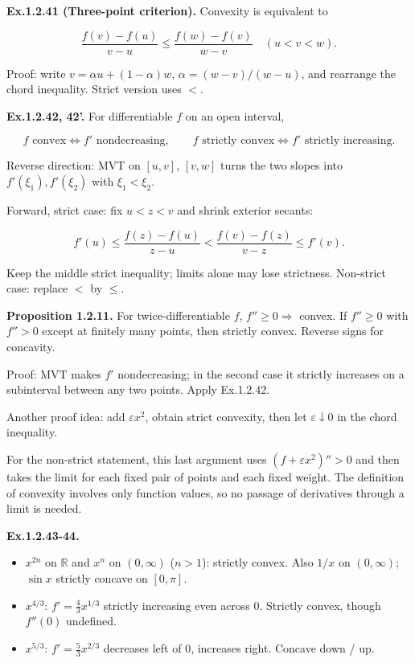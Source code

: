 \documentclass[11pt,a4paper]{article}
\begin{document}
\textbf{Ex.1.2.41 (Three-point criterion).} Convexity is equivalent to

\[
\frac{f(v)-f(u)}{v-u}\le\frac{f(w)-f(v)}{w-v}\quad(u<v<w).
\]

Proof: write \(v=\alpha u+(1-\alpha)w\), \(\alpha=(w-v)/(w-u)\), and
rearrange the chord inequality. Strict version uses \(<\).

\textbf{Ex.1.2.42, 42'.} For differentiable \(f\) on an open interval,

\[
f\text{ convex}\iff f'\text{ nondecreasing},\qquad
f\text{ strictly convex}\iff f'\text{ strictly increasing}.
\]

Reverse direction: MVT on \([u,v]\), \([v,w]\) turns the two slopes into
\(f'(\xi_1),f'(\xi_2)\) with \(\xi_1<\xi_2\).

Forward, strict case: fix \(u<z<v\) and shrink exterior secants:

\[
f'(u)\le\frac{f(z)-f(u)}{z-u}<\frac{f(v)-f(z)}{v-z}\le f'(v).
\]

Keep the middle strict inequality; limits alone may lose strictness.
Non-strict case: replace \(<\) by \(\le\).

\textbf{Proposition 1.2.11.} For twice-differentiable \(f\),
\(f''\ge0\Rightarrow\) convex. If \(f''\ge0\) with \(f''>0\) except at
finitely many points, then strictly convex. Reverse signs for concavity.

Proof: MVT makes \(f'\) nondecreasing; in the second case it strictly
increases on a subinterval between any two points. Apply Ex.1.2.42.

Another proof idea: add \(\varepsilon x^2\), obtain strict convexity,
then let \(\varepsilon\downarrow0\) in the chord inequality.

For the non-strict statement, this last argument uses
\((f+\varepsilon x^2)''>0\) and then takes the limit for each fixed pair
of points and each fixed weight. The definition of convexity involves
only function values, so no passage of derivatives through a limit is
needed.

\textbf{Ex.1.2.43-44.}

\begin{itemize}
\item
  \(x^{2n}\) on \(\mathbb R\) and \(x^n\) on \((0,\infty)\) (\(n>1\)):
  strictly convex. Also \(1/x\) on \((0,\infty)\); \(\sin x\) strictly
  concave on \([0,\pi]\).
\item
  \(x^{4/3}\): \(f'=\frac43x^{1/3}\) strictly increasing even across
  \(0\). Strictly convex, though \(f''(0)\) undefined.
\item
  \(x^{5/3}\): \(f'=\frac53x^{2/3}\) decreases left of \(0\), increases
  right. Concave down / up.
\end{itemize}
\end{document}

